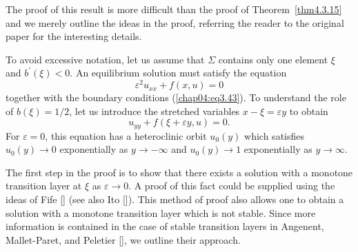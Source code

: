 \documentclass{surv-l}
\theoremstyle{plain}
\theoremstyle{definition}
\numberwithin{equation}{section}
\numberwithin{figure}{chapter}
\begin{document}
The proof of this result is more difficult than the proof of Theorem~\ref{thm4.3.15} and we merely outline the ideas in the proof, referring the reader to the original paper for the interesting details.

To avoid excessive notation, let us assume that $\Sigma$ contains only one element $\xi$ and $b^{\prime}(\xi)<0$. An equilibrium solution must satisfy the equation
\begin{equation}\label{chap04:eq3.48}
\varepsilon^{2}u_{xx}+f(x,u)=0
\end{equation}
together with the boundary conditions (\ref{chap04:eq3.43}). To understand the role of $b(\xi)= 1/2$, let us introduce the stretched variables $x-\xi=\varepsilon y$ to obtain
\begin{equation}\label{chap04:eq3.49}
u_{yy}+f(\xi+\varepsilon y,u)=0.
\end{equation}
For $\varepsilon =0$, this equation has a heteroclinic orbit $u_{0}(y)$ which satisfies $u_{0}(y)\rightarrow 0$ exponentially as $ y\rightarrow-\infty$ and $u_{0}(y)\rightarrow 1$ exponentially as $ y\rightarrow\infty$.

The first step in the proof is to show that there exists a solution with a monotone transition layer at $\xi$ as $\varepsilon \rightarrow 0$. A proof of this fact could be supplied using the ideas of Fife [\citeyear{1976f}] (see also Ito [\citeyear{1984i}]). This method of proof also allows one to obtain a solution with a monotone transition layer which is not stable. Since more information is contained in the case of stable transition layers in Angenent, Mallet-Paret, and Peletier [\citeyear{1987amp}], we outline their approach.
\end{document}
